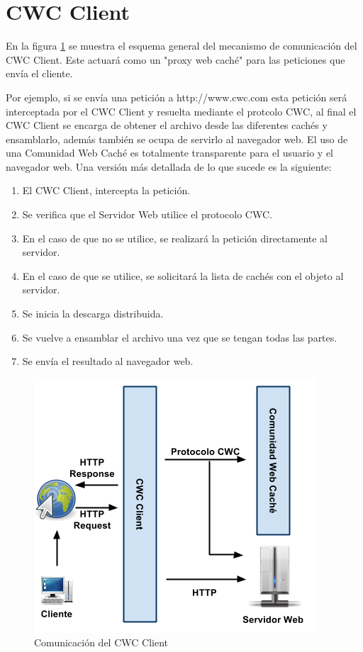 \section{CWC Client}
En la figura \ref{ComunicacionCWCClient} se muestra el esquema general del mecanismo de comunicación del CWC Client. Este actuará como un "proxy web caché" para las peticiones que envía el cliente. 

Por ejemplo, si se envía una petición a http://www.cwc.com esta petición será interceptada por el CWC Client y resuelta mediante el protcolo CWC, al final el CWC Client se encarga de obtener el archivo desde las diferentes cachés y ensamblarlo, además también se ocupa de servirlo al navegador web. El uso de una Comunidad Web Caché es totalmente transparente para el usuario y el navegador web. Una versión más detallada de lo que sucede es la siguiente:

\begin{enumerate}
\item El CWC Client, intercepta la petición.
\item Se verifica que el Servidor Web utilice el protocolo CWC.
\item En el caso de que no se utilice, se realizará la petición directamente al servidor.
\item En el caso de que se utilice, se solicitará la lista de cachés con el objeto al servidor.
\item Se inicia la descarga distribuida.
\item Se vuelve a ensamblar el archivo una vez que se tengan todas las partes.
\item Se envía el resultado al navegador web.
\end{enumerate}

\begin{figure}
  \centering
    \includegraphics[scale=0.75]{gfx/ComunicacionCWCClient}
  \caption{Comunicación del CWC Client}
  \label{ComunicacionCWCClient}
\end{figure}

